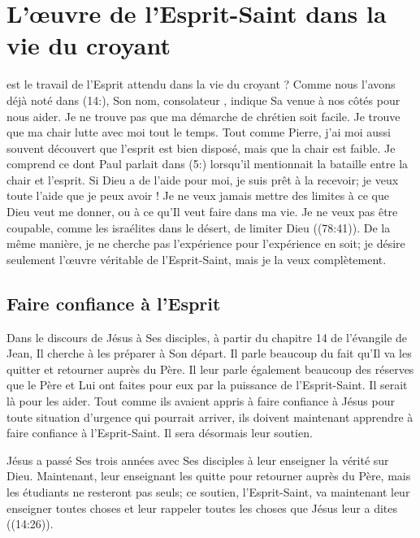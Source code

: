\chapter{L'œuvre de l'Esprit-Saint dans la vie du croyant}

 est le travail de l'Esprit attendu dans la vie du croyant ?
 Comme nous l'avons déjà noté dans (14:), Son nom,
 \og consolateur \fg{}, indique Sa venue à nos côtés pour nous aider.
 Je ne trouve pas que ma démarche de chrétien soit facile.
 Je trouve que ma chair lutte avec moi tout le temps.
 Tout comme Pierre, j'ai moi aussi souvent découvert que l'esprit
 est bien disposé, mais que la chair est faible.
 Je comprend ce dont Paul parlait dans (5:) lorsqu'il
 mentionnait la bataille entre la chair et l'esprit.
 Si Dieu a de l'aide pour moi, je suis prêt à la recevoir;
 je veux toute l'aide que je peux avoir !
 Je ne veux jamais mettre des limites à ce que Dieu veut me donner,
 ou à ce qu'Il veut faire dans ma vie. Je ne veux pas être coupable,
 comme les israélites dans le désert,
 de limiter Dieu ((78:41)).
 De la même manière, je ne cherche pas l'expérience
 pour l'expérience en soit; je désire seulement l'œuvre véritable
 de l'Esprit-Saint, mais je la veux complètement.

\section*{Faire confiance à l'Esprit}

Dans le discours de Jésus à Ses disciples, à partir du chapitre 14
 de l'évangile de Jean, Il cherche à les préparer à Son départ.
 Il parle beaucoup du fait qu'Il va les quitter et retourner auprès du Père.
 Il leur parle également beaucoup des réserves que le Père et Lui
 ont faites pour eux par la puissance de l'Esprit-Saint.
 Il serait là pour les aider. Tout comme ils avaient appris à faire confiance
 à Jésus pour toute situation d'urgence qui pourrait arriver,
 ils doivent maintenant apprendre à faire confiance à l'Esprit-Saint.
 Il sera désormais leur soutien.

Jésus a passé Ses trois années avec Ses disciples à leur enseigner
 la vérité sur Dieu. Maintenant, leur enseignant les quitte pour retourner
 auprès du Père, mais les étudiants ne resteront pas seuls;
 ce soutien, l'Esprit-Saint, va maintenant leur enseigner toutes choses
 et leur rappeler toutes les choses que Jésus leur a dites
 ((14:26)).

